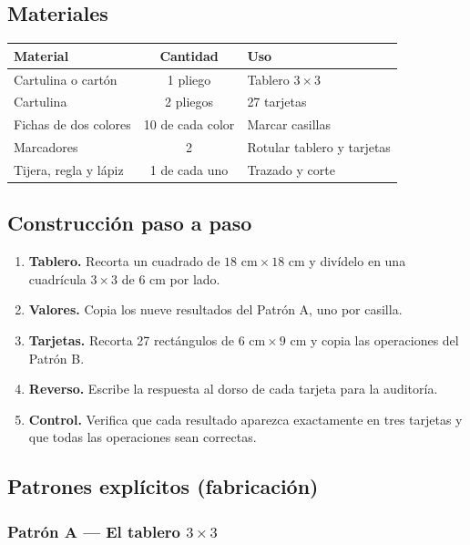 \documentclass[12pt, letterpaper]{article}
\begin{document}
\subsection{Materiales}

\begin{center}
\small
\begin{tabular}{@{}p{5.0cm} c p{7.4cm}@{}}
\toprule
\textbf{Material} & \textbf{Cantidad} & \textbf{Uso}\\
\midrule
Cartulina o cartón & 1 pliego & Tablero $3\times 3$\\
Cartulina & 2 pliegos & 27 tarjetas\\
Fichas de dos colores & 10 de cada color & Marcar casillas\\
Marcadores & 2 & Rotular tablero y tarjetas\\
Tijera, regla y lápiz & 1 de cada uno & Trazado y corte\\
\bottomrule
\end{tabular}
\end{center}

\subsection{Construcción paso a paso}

\begin{enumerate}[leftmargin=*]
  \item \textbf{Tablero.} Recorta un cuadrado de $18\text{ cm}\times 18\text{ cm}$ y divídelo en una cuadrícula $3\times 3$ de $6\text{ cm}$ por lado.
  \item \textbf{Valores.} Copia los nueve resultados del Patrón A, uno por casilla.
  \item \textbf{Tarjetas.} Recorta 27 rectángulos de $6\text{ cm}\times 9\text{ cm}$ y copia las operaciones del Patrón B.
  \item \textbf{Reverso.} Escribe la respuesta al dorso de cada tarjeta para la auditoría.
  \item \textbf{Control.} Verifica que cada resultado aparezca exactamente en tres tarjetas y que todas las operaciones sean correctas.
\end{enumerate}

\subsection{Patrones explícitos (fabricación)}

\subsubsection{Patrón A — El tablero $3\times 3$}
\end{document}

